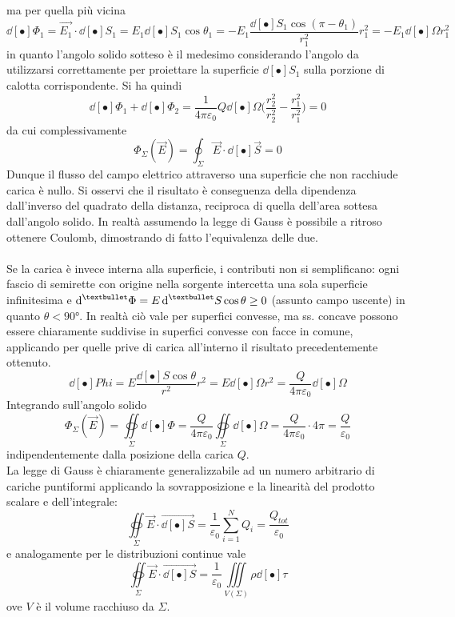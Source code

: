 ma per quella più vicina 
\[\dd[•]{\Phi_1} = \vec{E_1} \cdot \dd[•]{S_1} = E_1 \dd[•]{S_1} \cos \theta_1 = - E_1 \frac{\dd[•]{S_1} \cos (\pi - \theta_1)}{r_1^2} r_1^2 = - E_1 \dd[•]{\Omega} r_1^2\]
in quanto l'angolo solido sotteso è il medesimo considerando l'angolo da utilizzarsi correttamente per proiettare la superficie $\dd[•]{S_1}$ sulla porzione di calotta corrispondente. Si ha quindi
\[\dd[•]{\Phi_1} + \dd[•]{\Phi_2} = \frac{1}{4 \pi \varepsilon_0} Q \dd[•]{\Omega} \big(\frac{r_2^2}{r_2^2} - \frac{r_1^2}{r_1^2}\big) = 0\]
da cui complessivamente
\[\Phi_\Sigma(\vec{E}) = \oint_\Sigma \vec{E} \cdot \dd[•]{\vec{S}} = 0\]
Dunque il flusso del campo elettrico attraverso una superficie che non racchiude carica è nullo. Si osservi che il risultato è conseguenza della dipendenza dall'inverso del quadrato della distanza, reciproca di quella dell'area sottesa dall'angolo solido. In realtà assumendo la legge di Gauss è possibile a ritroso ottenere Coulomb, dimostrando di fatto l'equivalenza delle due.
\\~\\
Se la carica è invece interna alla superficie, i contributi non si semplificano: ogni fascio di semirette con origine nella sorgente intercetta una sola superficie infinitesima e $\ds \dd[•]{\Phi} = E \dd[•]{S} \cos \theta \geq 0$ (assunto campo uscente) in quanto $\theta < 90°$. In realtà ciò vale per superfici convesse, ma ss. concave possono essere chiaramente suddivise in superfici convesse con facce in comune, applicando per quelle prive di carica all'interno il risultato precedentemente ottenuto.
\[\dd[•]{Phi} = E \frac{\dd[•]{S} \cos \theta}{r^2} r^2 = E \dd[•]{\Omega} r^2 = \frac{Q}{4 \pi \varepsilon_0} \dd[•]{\Omega}\]
Integrando sull'angolo solido
\[\Phi_\Sigma(\vec{E}) = \oiint\limits_\Sigma \dd[•]{\Phi} = \frac{Q}{4 \pi \varepsilon_0} \oiint\limits_\Sigma \dd[•]{\Omega} = \frac{Q}{4 \pi \varepsilon_0} \cdot 4 \pi = \frac{Q}{\varepsilon_0}\]
indipendentemente dalla posizione della carica $Q$.
\\La legge di Gauss è chiaramente generalizzabile ad un numero arbitrario di cariche puntiformi applicando la sovrapposizione e la linearità del prodotto scalare e dell'integrale:
\[\oiint\limits_\Sigma \vec{E} \cdot \vec{\dd[•]{S}} = \frac{1}{\varepsilon_0} \sum\limits_{i=1}^{N} Q_i = \frac{Q_{tot}}{\varepsilon_0}\]
e analogamente per le distribuzioni continue vale
\[\oiint\limits_\Sigma \vec{E} \cdot \vec{\dd[•]{S}} = \frac{1}{\varepsilon_0} \iiint\limits_{V(\Sigma)} \rho \dd[•]{\tau}\]
ove $V$ è il volume racchiuso da $\Sigma$.

